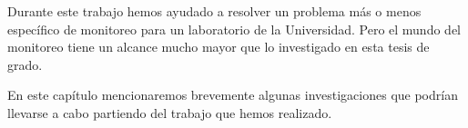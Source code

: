 Durante este trabajo hemos ayudado a resolver un problema más o menos específico de monitoreo para un laboratorio de la Universidad. Pero el mundo del monitoreo tiene un alcance mucho mayor que lo investigado en esta tesis de grado.

En este capítulo mencionaremos brevemente algunas investigaciones que podrían llevarse a cabo partiendo del trabajo que hemos realizado. 
